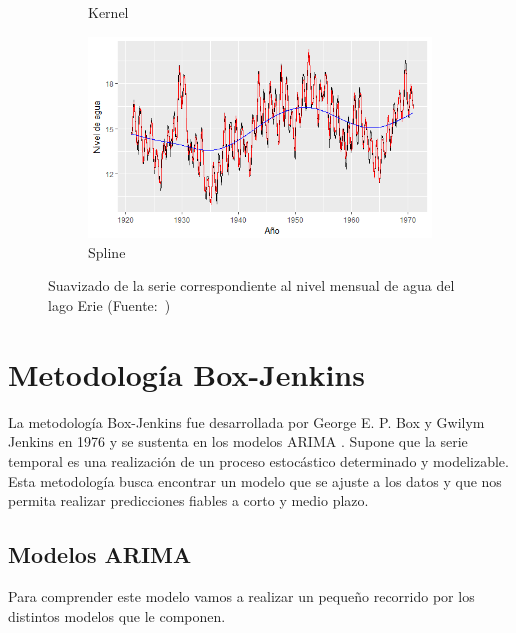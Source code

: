 \begin{figure} [t]
\begin{subfigure}{.5\textwidth}
  \caption{Kernel}
  \label{fig:sfig1}
\end{subfigure}
\begin{subfigure}{.5\textwidth}
  \centering
  \includegraphics[width=.8\linewidth]{Images/Conceptos/spln.png}
  \caption{Spline}
  \label{fig:sfig2}
\end{subfigure}
\caption{Suavizado de la serie correspondiente al nivel mensual de agua del lago Erie (Fuente:~\protect{})}
\label{suav}
\end{figure}




\section{Metodología Box-Jenkins}
La metodología Box-Jenkins fue desarrollada por George E. P. Box y Gwilym Jenkins en 1976 y se sustenta en los modelos ARIMA \cite{BoxJenkins2008}. Supone que la serie temporal es una realización de un proceso estocástico determinado y modelizable. Esta metodología busca encontrar un modelo que se ajuste a los datos y que nos permita realizar predicciones fiables a corto y medio plazo.

\subsection{Modelos ARIMA}
Para comprender este modelo vamos a realizar un pequeño recorrido por los distintos modelos que le componen.

